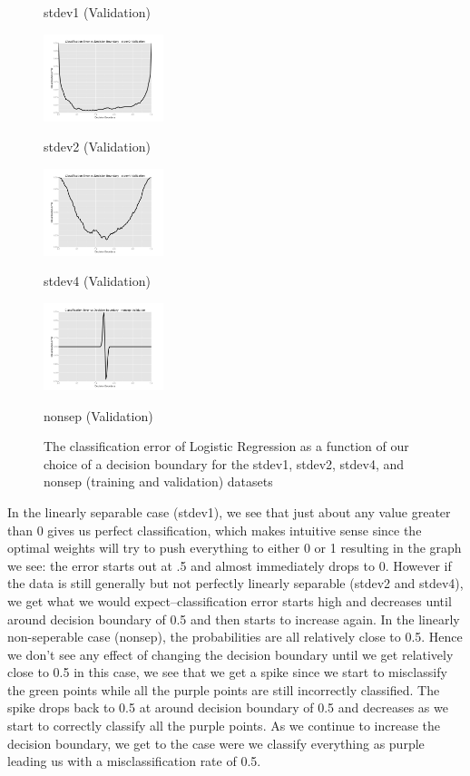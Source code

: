 \documentclass[10pt]{article}
\begin{document}
\begin{figure}[ht]
\begin{minipage}[b]{.24\linewidth}
		\caption*{stdev1 (Validation)}
	\end{minipage}
	\begin{minipage}[b]{.24\linewidth}
		\includegraphics[width=1\linewidth, height=1in]{CEDB_stdev2_validation.png}
		\caption*{stdev2 (Validation)}
	\end{minipage}
	\begin{minipage}[b]{.24\linewidth}
		\includegraphics[width=1\linewidth, height=1in]{CEDB_stdev4_validation.png}
		\caption*{stdev4 (Validation)}
	\end{minipage}
	\begin{minipage}[b]{.24\linewidth}
		\includegraphics[width=1\linewidth, height=1in]{CEDB_nonsep_validation.png}
		\caption*{nonsep (Validation)}
	\end{minipage}
	\caption{The classification error of Logistic Regression as a function of our choice of a decision boundary for the stdev1, stdev2, stdev4, and nonsep (training and validation) datasets}
\end{figure}

In the linearly separable case (stdev1), we see that just about any value greater than 0 gives us perfect classification, which makes intuitive sense since the optimal weights will try to push everything to either 0 or 1 resulting in the graph we see: the error starts out at .5 and almost immediately drops to 0. However if the data is still generally but not perfectly linearly separable (stdev2 and stdev4), we get what we would expect--classification error starts high and decreases until around decision boundary of 0.5 and then starts to increase again. In the linearly non-seperable case (nonsep), the probabilities are all relatively close to 0.5. Hence we don't see any effect of changing the decision boundary until we get relatively close to 0.5 in this case, we see that we get a spike since we start to misclassify the green points while all the purple points are still incorrectly classified. The spike drops back to 0.5 at around decision boundary of 0.5 and decreases as we start to correctly classify all the purple points. As we continue to increase the decision boundary, we get to the case were we classify everything as purple leading us with a misclassification rate of 0.5. 
\end{document}
